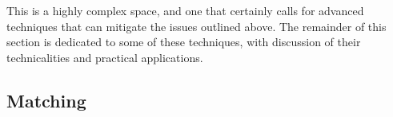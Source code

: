 {%
This is a highly complex space, and one that certainly calls for advanced techniques that can mitigate the issues outlined above. The remainder of this section is dedicated to some of these techniques, with discussion of their technicalities and practical applications.  }
\subsection{Matching}\label{matching}
